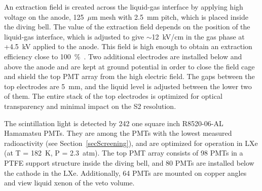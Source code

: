 An extraction field is created across the liquid-gas interface by applying high voltage on the anode, 125~$\mu$m mesh with 2.5~mm pitch, which is placed inside the diving bell. The value of the extraction field depends on the position of the liquid-gas interface, which is adjusted to give $\sim$12~kV/cm in the gas phase at +4.5~kV applied to the anode. This field is high enough to obtain an extraction efficiency close to 100~\%~\cite{ExtractionField}. 
Two additional electrodes are installed below and above the anode and are kept at ground potential in order to close the field cage and shield the top PMT array from the high electric field.  The gaps between the top electrodes are 5~mm, and the liquid level is adjusted between the lower two of them. The entire stack of the top electrodes is optimized for optical transparency and minimal impact on the S2 resolution.

The scintillation light is detected by 242 one square inch R8520-06-AL Hamamatsu PMTs. They are among the PMTs with the lowest measured radioactivity (see Section~\ref{secScreening}), and are optimized for operation in LXe (at T = 182~K, P = 2.3~atm). 
The top PMT array consists of 98 PMTs in a PTFE support structure inside the diving bell, and 80 PMTs are installed below the cathode in the LXe. Additionally, 64 PMTs are mounted on copper angles and view liquid xenon of the veto volume.

